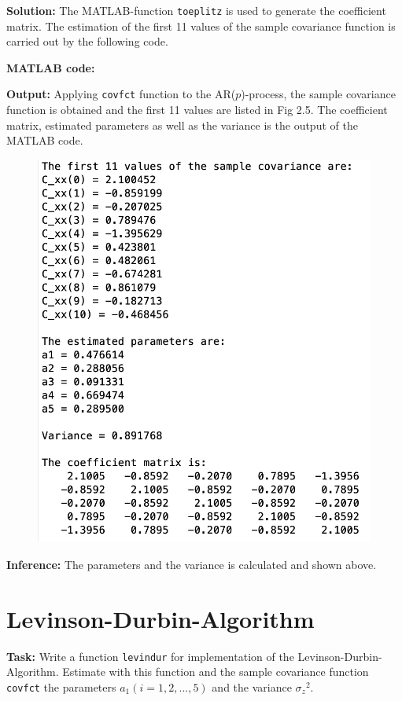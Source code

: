 \noindent \textbf{Solution:} The MATLAB-function \texttt{toeplitz} is used to generate the coefficient matrix. The estimation of the first 11 values of the sample covariance function is carried out by the following code.

\noindent \textbf{MATLAB code:}

\noindent \textbf{Output:} Applying \texttt{covfct} function to the AR($p$)-process, the sample covariance function is obtained and the first 11 values are listed in Fig 2.5. The coefficient matrix, estimated parameters as well as the variance is the output of the MATLAB code. 
\begin{figure}[H]
\centering
{\includegraphics[scale=0.66]{ass4_1.png}}
\end{figure}

\noindent \textbf{Inference:} The parameters and the variance is calculated and shown above.


\section{Levinson-Durbin-Algorithm}  \label{Levinson-Durbin-Algorithm }
\noindent \textbf{Task:} Write a function \texttt{levindur} for implementation of the Levinson-Durbin-Algorithm. Estimate with this function and the sample covariance function \texttt{covfct} the parameters $a_1(i=1,2,...,5)$ and the variance ${\sigma_z}^2$.
 
